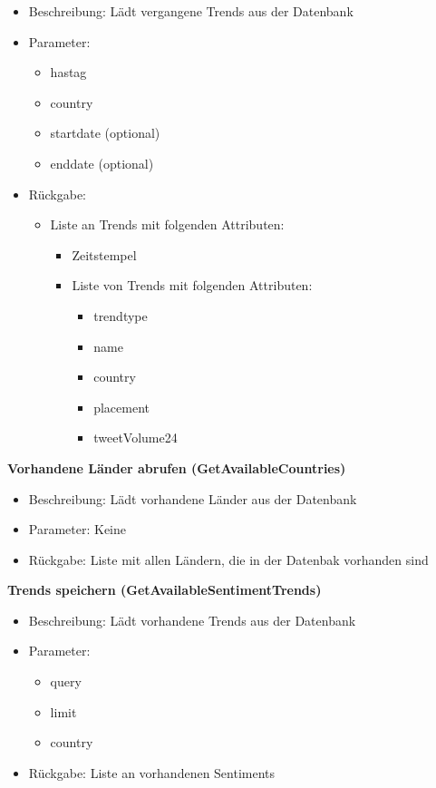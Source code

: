 \documentclass[conference]{IEEEtran}
\begin{document}
\begin{itemize}
    \item Beschreibung: Lädt vergangene Trends aus der Datenbank
    \item Parameter:
        \begin{itemize}
            \item hastag
            \item country
            \item startdate (optional)
            \item enddate (optional)
        \end{itemize}
    \item Rückgabe: 
        \begin{itemize}
            \item Liste an Trends mit folgenden Attributen:
                \begin{itemize}
                    \item Zeitstempel
                    \item Liste von Trends mit folgenden Attributen:
                        \begin{itemize}
                            \item trendtype
                            \item name
                            \item country
                            \item placement
                            \item tweetVolume24
                        \end{itemize}
                \end{itemize}
        \end{itemize}
\end{itemize}

\smallskip
\textbf{Vorhandene Länder abrufen (GetAvailableCountries)}
\begin{itemize}
    \item Beschreibung: Lädt vorhandene Länder aus der Datenbank
    \item Parameter: Keine
    \item Rückgabe: Liste mit allen Ländern, die in der Datenbak vorhanden sind
\end{itemize}

\smallskip
\textbf{Trends speichern (GetAvailableSentimentTrends)}
\begin{itemize}
    \item Beschreibung: Lädt vorhandene Trends aus der Datenbank
    \item Parameter: 
        \begin{itemize}
            \item query
            \item limit
            \item country
        \end{itemize}
    \item Rückgabe: Liste an vorhandenen Sentiments
\end{itemize}
\end{document}
